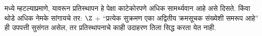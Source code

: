 \documentclass[../../../include/open-logic-section]{subfiles}
\begin{document}
 मध्ये म्हटल्याप्रमाणे, यावरून प्रतिस्थापन हे  पेक्षा काटेकोरपणे अधिक सामर्थ्यवान आहे असे दिसते. किंवा थोडे अधिक नेमके सांगायचे तर: $\Z$ + ``प्रत्येक सुक्रमण एका अद्वितीय क्रमसूचक संख्येशी समरूप आहे'' ही उपपत्ती सुसंगत असेल, तर प्रतिस्थापनाचे काही उदाहरण तिला सिद्ध करता येत नाही.

\end{document}
